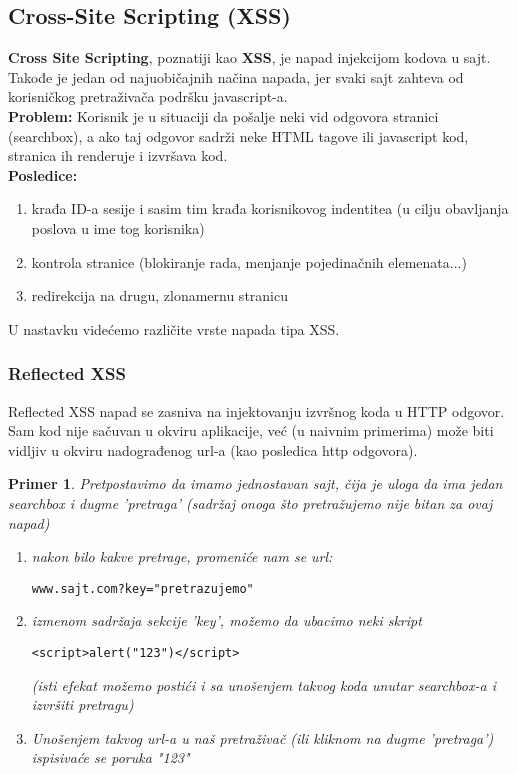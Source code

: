 \documentclass[a4paper]{article}
\newtheorem{primer}{Primer}[section]
\begin{document}
\subsection{Cross-Site Scripting (XSS)}
\textbf{Cross Site Scripting}, poznatiji kao \textbf{XSS}, je napad injekcijom kodova u sajt. Takođe je jedan od najuobi\v{c}ajnih na\v{c}ina napada, jer svaki sajt zahteva od korisni\v{c}kog pretra\v{z}iva\v{c}a podr\v{s}ku javascript-a.\\
\textbf{Problem:} Korisnik je u situaciji da po\v{s}alje neki vid odgovora stranici (searchbox), a ako taj odgovor sadr\v{z}i neke HTML tagove ili javascript kod, stranica ih renderuje i izvr\v{s}ava kod.\\
\textbf{Posledice:} \begin{enumerate}
	\item krađa ID-a sesije i sasim tim krađa korisnikovog indentitea (u cilju obavljanja poslova u ime tog korisnika)
	\item kontrola stranice (blokiranje rada, menjanje pojedina\v{c}nih elemenata...)
	\item redirekcija na drugu, zlonamernu stranicu
\end{enumerate}
U nastavku vide\'{c}emo razli\v{c}ite vrste napada tipa XSS.
\subsubsection{Reflected XSS}
Reflected XSS napad se zasniva na injektovanju izvr\v{s}nog koda u HTTP odgovor. Sam kod nije sa\v{c}uvan u okviru aplikacije, ve\'{c} (u naivnim primerima) mo\v{z}e biti vidljiv u okviru nadograđenog url-a (kao posledica http odgovora).
\begin{primer}\label{primer1}
Pretpostavimo da imamo jednostavan sajt, \v{c}ija je uloga da ima jedan searchbox i dugme 'pretraga' (sadr\v{z}aj onoga \v{s}to pretra\v{z}ujemo nije bitan za ovaj napad)
\begin{enumerate}
\item nakon bilo kakve pretrage, promeni\'{c}e nam se url: 
\begin{lstlisting}
www.sajt.com?key="pretrazujemo"
\end{lstlisting}
\item izmenom sadr\v{z}aja sekcije 'key', mo\v{z}emo da ubacimo neki skript

\begin{lstlisting}
<script>alert("123")</script>
\end{lstlisting}

(isti efekat mo\v{z}emo posti\'{c}i i sa uno\v{s}enjem takvog koda unutar searchbox-a i izvr\v{s}iti pretragu)
\item Uno\v{s}enjem takvog url-a u na\v{s} pretra\v{z}iva\v{c} (ili kliknom na dugme 'pretraga') ispisiva\'{c}e se poruka "123"\\

\end{enumerate}
\end{primer}
\end{document}
